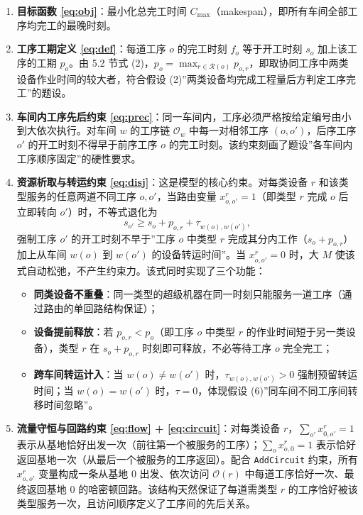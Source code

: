 \documentclass[12pt,a4paper]{ctexart}
\begin{document}
\begin{enumerate}[leftmargin=2.2em, label=(\arabic*)]
\item \textbf{目标函数 \eqref{eq:obj}}：最小化总完工时间 $C_{\max}$（makespan），即所有车间全部工序均完工的最晚时刻。

\item \textbf{工序工期定义 \eqref{eq:def}}：每道工序 $o$ 的完工时刻 $f_o$ 等于开工时刻 $s_o$ 加上该工序的工期 $p_o$。由 5.2 节式 (2)，$p_o=\max_{r\in\mathcal{R}(o)}p_{o,r}$，即取协同工序中两类设备作业时间的较大者，符合假设 (2)”两类设备均完成工程量后方判定工序完工”的题设。

\item \textbf{车间内工序先后约束 \eqref{eq:prec}}：同一车间内，工序必须严格按给定编号由小到大依次执行。对车间 $w$ 的工序链 $\mathcal{O}_w$ 中每一对相邻工序 $(o,o')$，后序工序 $o'$ 的开工时刻不得早于前序工序 $o$ 的完工时刻。该约束刻画了题设”各车间内工序顺序固定”的硬性要求。

\item \textbf{资源析取与转运约束 \eqref{eq:disj}}：这是模型的核心约束。对每类设备 $r$ 和该类型服务的任意两道不同工序 $o,o'$，当路由变量 $x^{r}_{o,o'}=1$（即类型 $r$ 完成 $o$ 后立即转向 $o'$）时，不等式退化为
\[
s_{o'} \ge s_o + p_{o,r} + \tau_{w(o),w(o')},
\]
强制工序 $o'$ 的开工时刻不早于”工序 $o$ 中类型 $r$ 完成其分内工作（$s_o+p_{o,r}$）加上从车间 $w(o)$ 到 $w(o')$ 的设备转运时间”。当 $x^{r}_{o,o'}=0$ 时，大 $M$ 使该式自动松弛，不产生约束力。该式同时实现了三个功能：
\begin{itemize}
\item \textbf{同类设备不重叠}：同一类型的超级机器在同一时刻只能服务一道工序（通过路由的单回路结构保证）；
\item \textbf{设备提前释放}：若 $p_{o,r}<p_o$（即工序 $o$ 中类型 $r$ 的作业时间短于另一类设备），类型 $r$ 在 $s_o+p_{o,r}$ 时刻即可释放，不必等待工序 $o$ 完全完工；
\item \textbf{跨车间转运计入}：当 $w(o)\neq w(o')$ 时，$\tau_{w(o),w(o')}>0$ 强制预留转运时间；当 $w(o)=w(o')$ 时，$\tau=0$，体现假设 (6)”同车间不同工序间转移时间忽略”。
\end{itemize}

\item \textbf{流量守恒与回路约束 \eqref{eq:flow} + \eqref{eq:circuit}}：对每类设备 $r$，$\sum_{o'}x^{r}_{0,o'}=1$ 表示从基地恰好出发一次（前往第一个被服务的工序）；$\sum_{o}x^{r}_{o,0}=1$ 表示恰好返回基地一次（从最后一个被服务的工序返回）。配合 \texttt{AddCircuit} 约束，所有 $x^{r}_{o,o'}$ 变量构成一条从基地 $0$ 出发、依次访问 $\mathcal{O}(r)$ 中每道工序恰好一次、最终返回基地 $0$ 的哈密顿回路。该结构天然保证了每道需类型 $r$ 的工序恰好被该类型服务一次，且访问顺序定义了工序间的先后关系。


\end{enumerate}
\end{document}
